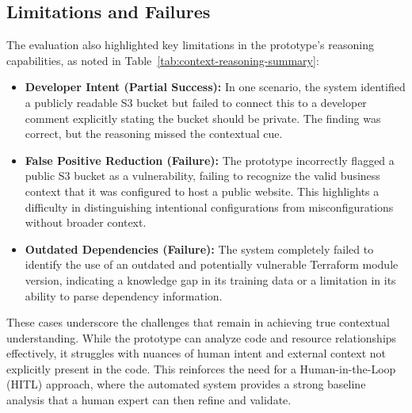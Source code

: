 \subsection{Limitations and Failures}
The evaluation also highlighted key limitations in the prototype's reasoning capabilities, as noted in Table~\ref{tab:context-reasoning-summary}:
\begin{itemize}
    \item \textbf{Developer Intent (Partial Success):} In one scenario, the system identified a publicly readable S3 bucket but failed to connect this to a developer comment explicitly stating the bucket should be private. The finding was correct, but the reasoning missed the contextual cue.
    \item \textbf{False Positive Reduction (Failure):} The prototype incorrectly flagged a public S3 bucket as a vulnerability, failing to recognize the valid business context that it was configured to host a public website. This highlights a difficulty in distinguishing intentional configurations from misconfigurations without broader context.
    \item \textbf{Outdated Dependencies (Failure):} The system completely failed to identify the use of an outdated and potentially vulnerable Terraform module version, indicating a knowledge gap in its training data or a limitation in its ability to parse dependency information.
\end{itemize}
These cases underscore the challenges that remain in achieving true contextual understanding. While the prototype can analyze code and resource relationships effectively, it struggles with nuances of human intent and external context not explicitly present in the code. This reinforces the need for a Human-in-the-Loop (HITL) approach, where the automated system provides a strong baseline analysis that a human expert can then refine and validate.



